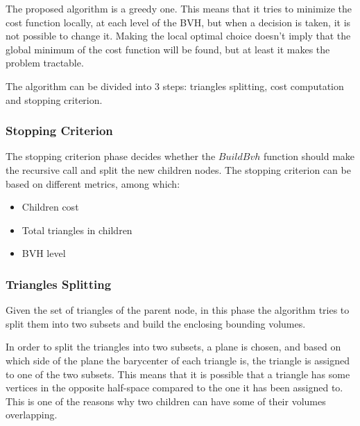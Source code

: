 \documentclass{PoliMi_MasterThesis}
\begin{document}
The proposed algorithm is a greedy one. This means that it tries to minimize the cost function locally, at each level of the BVH, but when a decision is taken, it is not possible to change it. Making the local optimal choice doesn't imply that the global minimum of the cost function will be found, but at least it makes the problem tractable.

The algorithm can be divided into 3 steps: triangles splitting, cost computation and stopping criterion.

\subsubsection*{Stopping Criterion}
The stopping criterion phase decides whether the $BuildBvh$ function should make the recursive call and split the new children nodes. The stopping criterion can be based on different metrics, among which:
\begin{itemize}
	\item Children cost
	\item Total triangles in children
	\item BVH level
\end{itemize}

\subsubsection*{Triangles Splitting} \label{ssec:triangles_splitting}
Given the set of triangles of the parent node, in this phase the algorithm tries to split them into two subsets and build the enclosing bounding volumes.

In order to split the triangles into two subsets, a plane is chosen, and based on which side of the plane the barycenter of each triangle is, the triangle is assigned to one of the two subsets. This means that it is possible that a triangle has some vertices in the opposite half-space compared to the one it has been assigned to. This is one of the reasons why two children can have some of their volumes overlapping. 
\end{document}
